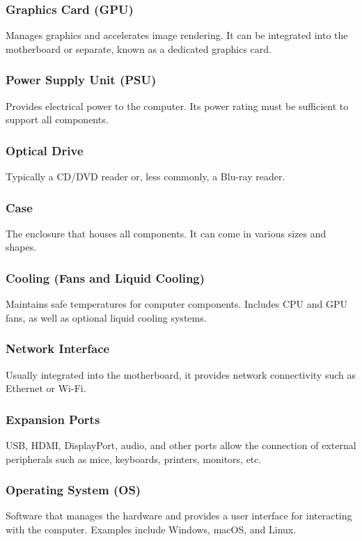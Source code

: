 \subsubsection{Graphics Card (GPU)}
Manages graphics and accelerates image rendering. It can be integrated into the motherboard or separate, known as a dedicated graphics card.

\subsubsection{Power Supply Unit (PSU)}
Provides electrical power to the computer. Its power rating must be sufficient to support all components.

\subsubsection{Optical Drive}
Typically a CD/DVD reader or, less commonly, a Blu-ray reader.

\subsubsection{Case}
The enclosure that houses all components. It can come in various sizes and shapes.

\subsubsection{Cooling (Fans and Liquid Cooling)}
Maintains safe temperatures for computer components. Includes CPU and GPU fans, as well as optional liquid cooling systems.

\subsubsection{Network Interface}
Usually integrated into the motherboard, it provides network connectivity such as Ethernet or Wi-Fi.

\subsubsection{Expansion Ports}
USB, HDMI, DisplayPort, audio, and other ports allow the connection of external peripherals such as mice, keyboards, printers, monitors, etc.

\subsubsection{Operating System (OS)}
Software that manages the hardware and provides a user interface for interacting with the computer. Examples include Windows, macOS, and Linux.


